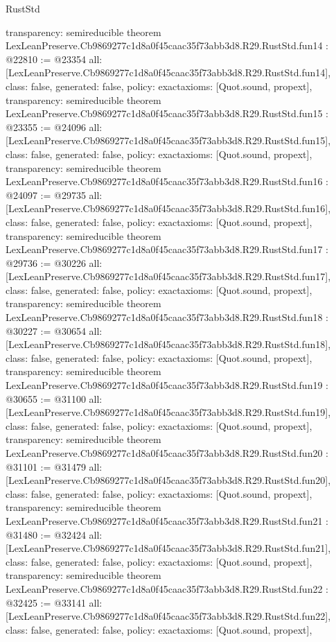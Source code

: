 \begin{lexlean}{RustStd}
\begin{coremodule}
{  transparency: semireducible
}
theorem LexLeanPreserve.Cb9869277c1d8a0f45caac35f73abb3d8.R29.RustStd.fun14 : @22810 := @23354 {
  all: [LexLeanPreserve.Cb9869277c1d8a0f45caac35f73abb3d8.R29.RustStd.fun14],
  class: false,
  generated: false,
  policy: exact{axioms: [Quot.sound, propext]},
  transparency: semireducible
}
theorem LexLeanPreserve.Cb9869277c1d8a0f45caac35f73abb3d8.R29.RustStd.fun15 : @23355 := @24096 {
  all: [LexLeanPreserve.Cb9869277c1d8a0f45caac35f73abb3d8.R29.RustStd.fun15],
  class: false,
  generated: false,
  policy: exact{axioms: [Quot.sound, propext]},
  transparency: semireducible
}
theorem LexLeanPreserve.Cb9869277c1d8a0f45caac35f73abb3d8.R29.RustStd.fun16 : @24097 := @29735 {
  all: [LexLeanPreserve.Cb9869277c1d8a0f45caac35f73abb3d8.R29.RustStd.fun16],
  class: false,
  generated: false,
  policy: exact{axioms: [Quot.sound, propext]},
  transparency: semireducible
}
theorem LexLeanPreserve.Cb9869277c1d8a0f45caac35f73abb3d8.R29.RustStd.fun17 : @29736 := @30226 {
  all: [LexLeanPreserve.Cb9869277c1d8a0f45caac35f73abb3d8.R29.RustStd.fun17],
  class: false,
  generated: false,
  policy: exact{axioms: [Quot.sound, propext]},
  transparency: semireducible
}
theorem LexLeanPreserve.Cb9869277c1d8a0f45caac35f73abb3d8.R29.RustStd.fun18 : @30227 := @30654 {
  all: [LexLeanPreserve.Cb9869277c1d8a0f45caac35f73abb3d8.R29.RustStd.fun18],
  class: false,
  generated: false,
  policy: exact{axioms: [Quot.sound, propext]},
  transparency: semireducible
}
theorem LexLeanPreserve.Cb9869277c1d8a0f45caac35f73abb3d8.R29.RustStd.fun19 : @30655 := @31100 {
  all: [LexLeanPreserve.Cb9869277c1d8a0f45caac35f73abb3d8.R29.RustStd.fun19],
  class: false,
  generated: false,
  policy: exact{axioms: [Quot.sound, propext]},
  transparency: semireducible
}
theorem LexLeanPreserve.Cb9869277c1d8a0f45caac35f73abb3d8.R29.RustStd.fun20 : @31101 := @31479 {
  all: [LexLeanPreserve.Cb9869277c1d8a0f45caac35f73abb3d8.R29.RustStd.fun20],
  class: false,
  generated: false,
  policy: exact{axioms: [Quot.sound, propext]},
  transparency: semireducible
}
theorem LexLeanPreserve.Cb9869277c1d8a0f45caac35f73abb3d8.R29.RustStd.fun21 : @31480 := @32424 {
  all: [LexLeanPreserve.Cb9869277c1d8a0f45caac35f73abb3d8.R29.RustStd.fun21],
  class: false,
  generated: false,
  policy: exact{axioms: [Quot.sound, propext]},
  transparency: semireducible
}
theorem LexLeanPreserve.Cb9869277c1d8a0f45caac35f73abb3d8.R29.RustStd.fun22 : @32425 := @33141 {
  all: [LexLeanPreserve.Cb9869277c1d8a0f45caac35f73abb3d8.R29.RustStd.fun22],
  class: false,
  generated: false,
  policy: exact{axioms: [Quot.sound, propext]},
}
\end{coremodule}
\end{lexlean}

